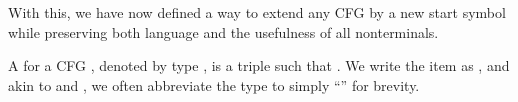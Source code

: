 \begin{isabellebody}
\begin{isamarkuptext}
With this, we have now defined a way to extend any CFG by a new start symbol while preserving both 
language and the usefulness of all nonterminals.%
\end{isamarkuptext}\isamarkuptrue%
%
\isadelimdocument
%
\endisadelimdocument
%
\isatagdocument
%
\isamarkuptrue%
%
\endisatagdocument
{\isafolddocument}%
%
\isadelimdocument
%
\endisadelimdocument
%
\begin{isamarkuptext}%
\begin{definition}
A  for a CFG , denoted by type , is a triple 
\mbox{} such that 
. We write the item  as , and akin to
 and , we often abbreviate the type  to simply
``'' for brevity.
\end{definition}


\end{isamarkuptext}
\end{isabellebody}

